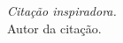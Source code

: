 
\chapter*{}
\vspace{15cm}
\begin{flushright}
	\textit
	{
		Citação inspiradora.
	}\medskip\\ 
	Autor da citação.
\end{flushright}